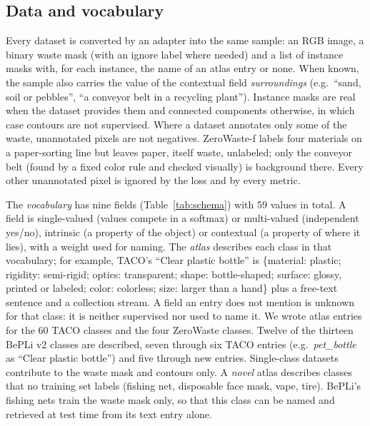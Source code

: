 \documentclass[pdflatex,sn-basic,Numbered]{sn-jnl}%
\begin{document}
\subsection{Data and vocabulary}\label{sec:canonical}
Every dataset is converted by an adapter into the same sample: an RGB image, a binary waste mask (with an ignore label where needed) and a list of instance masks with, for each instance, the name of an atlas entry or none. When known, the sample also carries the value of the contextual field \emph{surroundings} (e.g.\ ``sand, soil or pebbles'', ``a conveyor belt in a recycling plant''). Instance masks are real when the dataset provides them and connected components otherwise, in which case contours are not supervised. Where a dataset annotates only some of the waste, unannotated pixels are not negatives. ZeroWaste-f labels four materials on a paper-sorting line but leaves paper, itself waste, unlabeled; only the conveyor belt (found by a fixed color rule and checked visually) is background there. Every other unannotated pixel is ignored by the loss and by every metric.

The \emph{vocabulary} has nine fields (Table~\ref{tab:schema}) with 59 values in total. A field is single-valued (values compete in a softmax) or multi-valued (independent yes/no), intrinsic (a property of the object) or contextual (a property of where it lies), with a weight used for naming. The \emph{atlas} describes each class in that vocabulary; for example, TACO's ``Clear plastic bottle'' is \{material: plastic; rigidity: semi-rigid; optics: transparent; shape: bottle-shaped; surface: glossy, printed or labeled; color: colorless; size: larger than a hand\} plus a free-text sentence and a collection stream. A field an entry does not mention is unknown for that class: it is neither supervised nor used to name it. We wrote atlas entries for the 60 TACO classes and the four ZeroWaste classes. Twelve of the thirteen BePLi v2 classes are described, seven through six TACO entries (e.g.\ \emph{pet\_bottle} as ``Clear plastic bottle'') and five through new entries. Single-class datasets contribute to the waste mask and contours only. A \emph{novel} atlas describes classes that no training set labels (fishing net, disposable face mask, vape, tire). BePLi's fishing nets train the waste mask only, so that this class can be named and retrieved at test time from its text entry alone.
\end{document}
